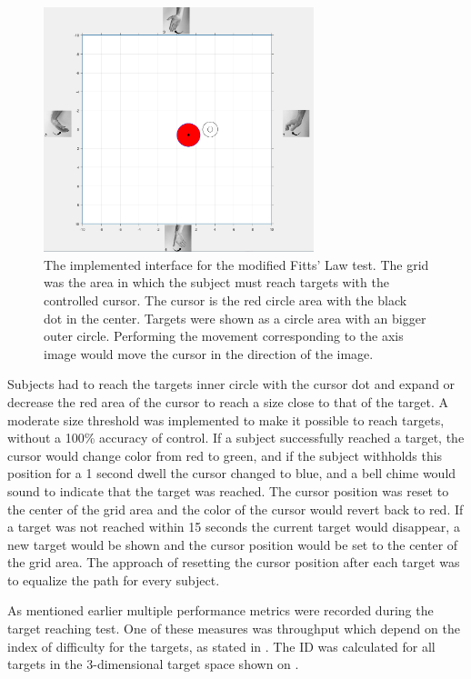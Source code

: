 \begin{figure}[H] 
	\includegraphics[width=0.7\textwidth]{figures/xBackground/perftestGUI}
	\caption{The implemented interface for the modified Fitts' Law test. The grid was the area in which the subject must reach targets with the controlled cursor. The cursor is the red circle area with the black dot in the center. Targets were shown as a circle area with an bigger outer circle. Performing the movement corresponding to the axis image would move the cursor in the direction of the image.}
	\label{fig:fittsLawTask}
\end{figure}

Subjects had to reach the targets inner circle with the cursor dot and expand or decrease the red area of the cursor to reach a size close to that of the target. A moderate size threshold was implemented to make it possible to reach targets, without a 100\% accuracy of control. If a subject successfully reached a target, the cursor would change color from red to green, and if the subject withholds this position for a 1 second dwell the cursor changed to blue, and a bell chime would sound to indicate that the target was reached. The cursor position was reset to the center of the grid area and the color of the cursor would revert back to red. If a target was not reached within 15 seconds the current target would disappear, a new target would be shown and the cursor position would be set to the center of the grid area. The approach of resetting the cursor position after each target was to equalize the path for every subject. 

As mentioned earlier multiple performance metrics were recorded during the target reaching test. One of these measures was throughput which depend on the index of difficulty for the targets, as stated in . The ID was calculated for all targets in the 3-dimensional target space shown on . 

